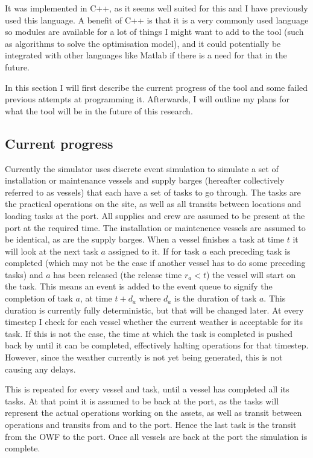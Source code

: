\documentclass[a4paper,12pt]{article}
\begin{document}
It was implemented in C++, as it seems well suited for this and I have previously used this language. A benefit of C++ is that it is a very commonly used language so modules are available for a lot of things I might want to add to the tool (such as algorithms to solve the optimisation model), and it could potentially be integrated with other languages like Matlab if there is a need for that in the future. 

In this section I will first describe the current progress of the tool and some failed previous attempts at programming it. Afterwards, I will outline my plans for what the tool will be in the future of this research.

\subsection{Current progress} \label{ss:simprog}
Currently the simulator uses discrete event simulation to simulate a set of installation or maintenance vessels and supply barges (hereafter collectively referred to as vessels) that each have a set of tasks to go through. The tasks are the practical operations on the site, as well as all transits between locations and loading tasks at the port. All supplies and crew are assumed to be present at the port at the required time. The installation or maintenence vessels are assumed to be identical, as are the supply barges. When a vessel finishes a task at time $t$ it will look at the next task $a$ assigned to it. If for task $a$ each preceding task is completed (which may not be the case if another vessel has to do some preceding tasks) and $a$ has been released (the release time $r_a < t$) the vessel will start on the task. This means an event is added to the event queue to signify the completion of task $a$, at time $t + d_a$ where $d_a$ is the duration of task $a$. This duration is currently fully deterministic, but that will be changed later. At every timestep I check for each vessel whether the current weather is acceptable for its task. If this is not the case, the time at which the task is completed is pushed back by until it can be completed, effectively halting operations for that timestep. However, since the weather currently is not yet being generated, this is not causing any delays. 

This is repeated for every vessel and task, until a vessel has completed all its tasks. At that point it is assumed to be back at the port, as the tasks will represent the actual operations working on the assets, as well as transit between operations and transits from and to the port. Hence the last task is the transit from the OWF to the port. Once all vessels are back at the port the simulation is complete. 
\end{document}
